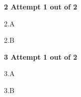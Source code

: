 \documentclass[12pt]{article}
\begin{document}
\begin{flushleft}
	\bf 2 \hspace{2cm} Attempt 1 out of 2\\  
\end{flushleft}	
\begin{flushleft}

	{2.A}\hspace{2cm}
	 \hspace{1cm}   \hspace{1cm}  \hspace{1cm} \par
\end{flushleft}	
\begin{flushleft}

	{2.B}\hspace{2cm}
	 \hspace{1cm}   \hspace{1cm}  \hspace{1cm} \par
\end{flushleft}	



\begin{flushleft}
	\bf 3 \hspace{2cm} Attempt 1 out of 2\\  
\end{flushleft}	
\begin{flushleft}

	{3.A}\hspace{2cm}
	 \hspace{1cm}   \hspace{1cm}  \hspace{1cm} \par
\end{flushleft}	
\begin{flushleft}

	{3.B}\hspace{2cm}
	 \hspace{1cm}   \hspace{1cm}  \hspace{1cm} \par
\end{flushleft}	
\end{document}
